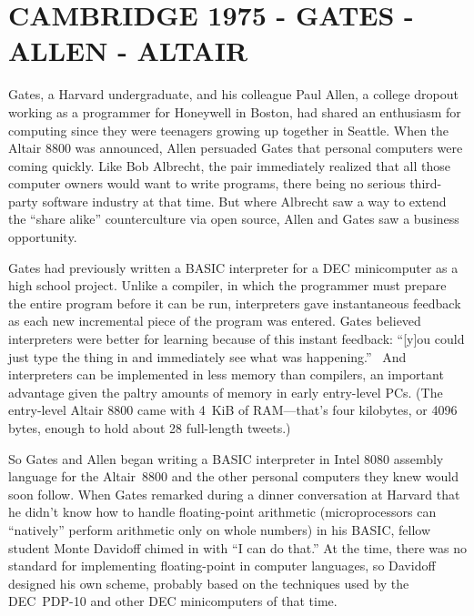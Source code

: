 
\section{CAMBRIDGE 1975 - GATES - ALLEN - ALTAIR}



Gates, a Harvard undergraduate, and his colleague 
Paul Allen, a college dropout working as a programmer for Honeywell
in Boston, had shared an enthusiasm for computing since they were
teenagers growing up together in Seattle.
When the Altair 8800 was announced,
Allen persuaded Gates that personal computers were coming quickly.
Like Bob Albrecht, the pair immediately realized that all those
computer owners would want to write programs, there being no serious third-party
software industry at that time.
But where Albrecht saw a way to extend the ``share alike''
counterculture via open source, Allen and Gates saw a business opportunity.

Gates had previously written a BASIC interpreter for a DEC 
minicomputer as a high school project.
Unlike a compiler, in which the programmer must prepare the entire
program before it can be run, interpreters gave instantaneous feedback
as each new incremental piece of the program was entered.
Gates believed interpreters were better for learning because of this
instant feedback: ``[y]ou could just type the thing in and
immediately see what was happening.''~\cite{smithsonian_interview}
And interpreters can be implemented in less memory than compilers,
an important advantage given the paltry amounts of memory in early
entry-level PCs. (The entry-level Altair 8800 came with 4~KiB of RAM---that's
four kilobytes, or 4096 bytes, enough to hold about 28 full-length tweets.)

So Gates and Allen began writing a BASIC interpreter in Intel 8080
assembly language for the Altair~8800 and the other personal computers
they knew would soon follow.
When Gates remarked during a dinner conversation at Harvard that he
didn't know how to handle floating-point arithmetic (microprocessors
can ``natively'' perform arithmetic only on whole numbers)
in his BASIC, fellow student Monte
Davidoff chimed in with ``I can do that.''
At the time, there was no standard for implementing floating-point in
computer languages, so Davidoff designed his own scheme, probably
based on the techniques used by the DEC~PDP-10 and other DEC
minicomputers of that time.


